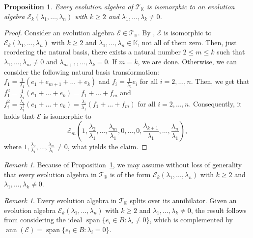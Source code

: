 \documentclass[12pt,reqno]{amsart}
\newtheorem{proposition}[theorem]{Proposition}
\theoremstyle{definition}
\theoremstyle{remark}
\newtheorem{remark}[theorem]{Remark}
\DeclareMathOperator{\ann}{ann}
\DeclareMathOperator{\spa}{span}
\numberwithin{equation}{section}
\begin{document}
\begin{proposition}\label{prop:T_parameters}
Every evolution algebra of $\mathcal{T}_{\mathbb{K}}$ is isomorphic to an evolution algebra $\mathcal{E}_k(\lambda_1,\dots,\lambda_n)$ with $k\geq2$ and $\lambda_1,\dots,\lambda_k\neq0$.
\end{proposition}
\begin{proof}
Consider an evolution algebra $\mathcal{E}\in\mathcal{T}_{\mathbb{K}}$. By \cite[Proposition~2.5 \& Remark~2.6]{CGOT_13}, $\mathcal{E}$ is isomorphic to $\mathcal{E}_k(\lambda_1,\dots,\lambda_n)$ with $k\geq2$ and $\lambda_1,\dots,\lambda_n\in\mathbb{K}$, not all of them zero. Then, just reordering the natural basis, there exists a natural number $2\leq m\leq k$ such that $\lambda_1,\dots,\lambda_m\neq0$ and $\lambda_{m+1},\dots,\lambda_k=0$. If $m=k$, we are done. Otherwise, we can consider the following natural basis transformation:
$f_1=\frac{1}{\lambda_1}(e_1+e_{m+1}+\dots+e_k)$ and $f_i=\frac{1}{\lambda_1}e_i$ for all $i=2,\dots,n$. Then, we get that $f_1^2=\frac{1}{\lambda_1}(e_1+\dots+e_k)=f_1+\dots+f_m$ and $f_i^2=\frac{\lambda_i}{\lambda_1^2}(e_1+\dots+e_k)=\frac{\lambda_i}{\lambda_1}(f_1+\dots+f_m)$ for all $i=2,\dots,n$. Consequently, it holds that $\mathcal{E}$ is isomorphic to 
\[\mathcal{E}_m\left(1,\frac{\lambda_2}{\lambda_1},\dots,\frac{\lambda_m}{\lambda_1},0,\dots,0,\frac{\lambda_{k+1}}{\lambda_1},\dots,\frac{\lambda_n}{\lambda_1}\right),\]
where $1,\frac{\lambda_2}{\lambda_1},\dots,\frac{\lambda_m}{\lambda_1}\neq0$, what yields the claim.
\end{proof}
\begin{remark}\label{rem:T_parameters}
	Because of Proposition~\ref{prop:T_parameters}, we may assume without loss of generality that every evolution algebra in $\mathcal{T}_{\mathbb{K}}$ is of the form $\mathcal{E}_k(\lambda_1,\dots,\lambda_n)$ with $k\geq2$ and $\lambda_1,\dots,\lambda_k\neq0$.
\end{remark}
\begin{remark}\label{rem:split}
	Every evolution algebra in $\mathcal{T}_\mathbb{K}$ splits over its annihilator. Given an evolution algebra $\mathcal{E}_k(\lambda_1,\dots,\lambda_n)$ with $k\geq2$ and $\lambda_1,\dots,\lambda_k\neq0$, the result follows from considering the ideal $\spa\{e_i\in B\colon\lambda_i\neq0\}$, which is complemented by $\ann(\mathcal{E})=\spa\{e_i\in B\colon\lambda_i=0\}$.
\end{remark}
\end{document}
